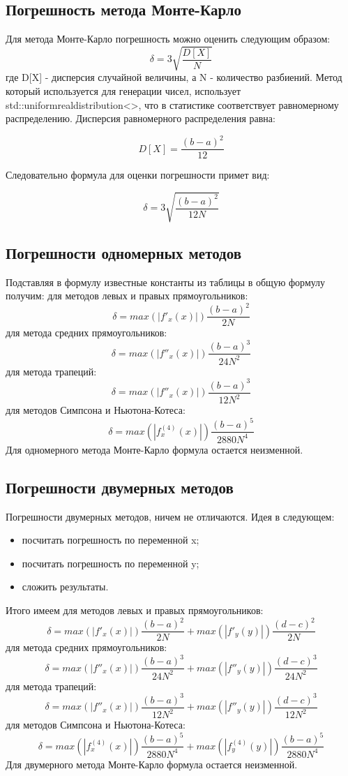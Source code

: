 \documentclass{article}
\begin{document}
\subsection{Погрешность метода Монте-Карло}
Для метода Монте-Карло погрешность можно оценить следующим образом:
$$\delta = 3\sqrt{\frac{D[X]}{N}} $$
где D[X] - дисперсия случайной величины, а N - количество разбиений.
Метод который используется для генерации чисел, использует
std::uniform\text{_}real\text{_}distribution<>, что в статистике
соответствует равномерному распределению. Дисперсия равномерного распределения
равна:

$$ D[X] = \frac{(b-a)^2}{12} $$

Следовательно формула для оценки погрешности примет вид:

$$\delta = 3\sqrt{\frac{(b-a)^2}{12N}} $$

\subsection{Погрешности одномерных методов}
Подставляя в формулу известные константы из таблицы в общую формулу получим:
для методов левых и правых прямоугольников:
$$\delta = max(|f'_{x}(x)|)\frac{(b-a)^2}{2N} $$
для метода средних прямоугольников:
$$\delta = max(|f''_{x}(x)|)\frac{(b-a)^3}{24N^2} $$
для метода трапеций:
$$\delta = max(|f''_{x}(x)|)\frac{(b-a)^3}{12N^2} $$
для методов Симпсона и Ньютона-Котеса:
$$\delta = max(|f^{(4)}_{x}(x)|)\frac{(b-a)^5}{2880N^4} $$
Для одномерного метода Монте-Карло формула остается неизменной.
\subsection{Погрешности двумерных методов}
Погрешности двумерных методов, ничем не отличаются. Идея в следующем:
\begin{itemize}
  \item посчитать погрешность по переменной x;
  \item посчитать погрешность по переменной y;
  \item сложить результаты.
\end{itemize}
Итого имеем для методов левых и правых прямоугольников:
$$\delta = max(|f'_{x}(x)|)\frac{(b-a)^2}{2N}+max(|f'_{y}(y)|)\frac{(d-c)^2}{2N}  $$
для метода средних прямоугольников:
$$\delta = max(|f''_{x}(x)|)\frac{(b-a)^3}{24N^2}+max(|f''_{y}(y)|)\frac{(d-c)^3}{24N^2} $$
для метода трапеций:
$$\delta = max(|f''_{x}(x)|)\frac{(b-a)^3}{12N^2}+max(|f''_{y}(y)|)\frac{(d-c)^3}{12N^2} $$
для методов Симпсона и Ньютона-Котеса:
$$\delta = max(|f^{(4)}_{x}(x)|)\frac{(b-a)^5}{2880N^4}+max(|f^{(4)}_{y}(y)|)\frac{(b-a)^5}{2880N^4} $$
Для двумерного метода Монте-Карло формула остается неизменной.
\end{document}
